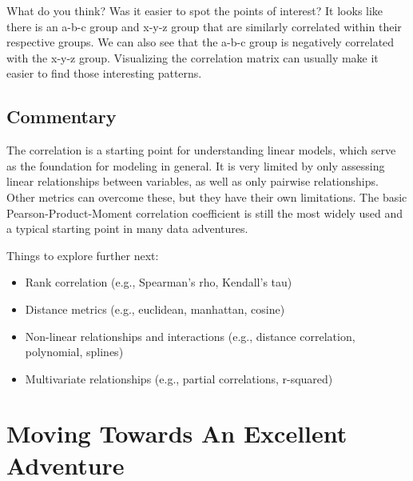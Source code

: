 \documentclass[
  letterpaper,
]{krantz}
\providecommand{\tightlist}{%
  \setlength{\itemsep}{0pt}\setlength{\parskip}{0pt}}\usepackage{longtable,booktabs,array}
\begin{document}
What do you think? Was it easier to spot the points of interest? It
looks like there is an a-b-c group and x-y-z group that are similarly
correlated within their respective groups. We can also see that the
a-b-c group is negatively correlated with the x-y-z group. Visualizing
the correlation matrix can usually make it easier to find those
interesting patterns.

\subsection*{Commentary}\label{commentary}

The correlation is a starting point for understanding linear models,
which serve as the foundation for modeling in general. It is very
limited by only assessing linear relationships between variables, as
well as only pairwise relationships. Other metrics can overcome these,
but they have their own limitations. The basic Pearson-Product-Moment
correlation coefficient is still the most widely used and a typical
starting point in many data adventures.

Things to explore further next:

\begin{itemize}
\tightlist
\item
  Rank correlation (e.g., Spearman's rho, Kendall's tau)
\item
  Distance metrics (e.g., euclidean, manhattan, cosine)
\item
  Non-linear relationships and interactions (e.g., distance correlation,
  polynomial, splines)
\item
  Multivariate relationships (e.g., partial correlations, r-squared)
\end{itemize}

\section*{Moving Towards An Excellent
Adventure}\label{moving-towards-an-excellent-adventure}

\end{document}
